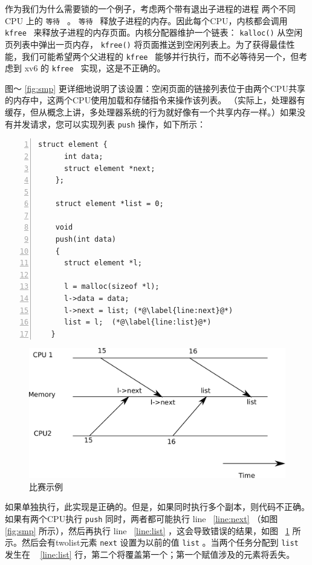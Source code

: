 \documentclass[UTF8]{article}
\begin{document}
作为我们为什么需要锁的一个例子，考虑两个带有退出子进程的进程
 两个不同 CPU 上的  {    \tt    等待   } 。  {    \tt    等待   }  释放子进程的内存。因此每个CPU，内核都会调用 {    \tt    kfree   } 来释放子进程的内存页面。内核分配器维护一个链表：   \lstinline{kalloc()}           从空闲页列表中弹出一页内存，   \lstinline{kfree()}   
        将页面推送到空闲列表上。为了获得最佳性能，我们可能希望两个父进程的  {    \tt    kfree   }  能够并行执行，而不必等待另一个，但考虑到 xv6 的  {    \tt    kfree   }  实现，这是不正确的。  

图〜   \ref{fig:smp}   更详细地说明了该设置：空闲页面的链接列表位于由两个CPU共享的内存中，这两个CPU使用加载和存储指令来操作该列表。 （实际上，处理器有缓存，但从概念上讲，多处理器系统的行为就好像有一个共享内存一样。）如果没有并发请求，您可以实现列表    \lstinline{push}    操作，如下所示：
    \begin{lstlisting}[numbers=left,firstnumber=1]
    struct element {
      int data;
      struct element *next;
    };
    
    struct element *list = 0;
    
    void
    push(int data)
    {
      struct element *l;
   
      l = malloc(sizeof *l);
      l->data = data;
      l->next = list; (*@\label{line:next}@*)
      list = l;  (*@\label{line:list}@*)
   }
\end{lstlisting}     

   \begin{figure}[t]
\center
\includegraphics[scale=0.5]{fig/race.pdf}
\caption{比赛示例  }
\label{fig:race}
\end{figure}    如果单独执行，此实现是正确的。但是，如果同时执行多个副本，则代码不正确。如果有两个CPU执行
    \lstinline{push}    同时，两者都可能执行 line~    \ref{line:next}    （如图~    \ref{fig:smp}    所示），然后再执行 line~    \ref{line:list}    ，这会导致错误的结果，如图~    \ref{fig:race}    所示。然后会有twolist元素
    \lstinline{next}    设置为以前的值
    \lstinline{list}   。当两个任务分配到
    \lstinline{list}    发生在 ~    \ref{line:list}    行，第二个将覆盖第一个；第一个赋值涉及的元素将丢失。  
\end{document}
